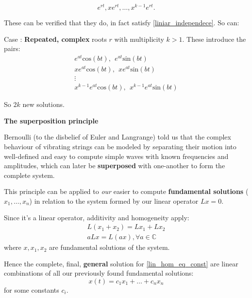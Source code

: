 \[
  e^{rt}, xe^{rt}, \dots,x^{k-1}e^{rt}.
\]

These can be verified that they do, in fact satisfy \ref{liniar_independece}. So can:

Case : \textbf{Repeated, complex} roots $r$ with multiplicity $k>1$. These introduce the pairs:
\begin{align*}
  e^{at}\text{cos}(bt), \ \  e^{at}\text{sin}(bt)  \\
  xe^{at}\text{cos}(bt), \ \ xe^{at}\text{sin}(bt) \\
  \vdots                                           \\
  x^{k-1}e^{at}\text{cos}(bt), \ \ x^{k-1}e^{at}\text{sin}(bt)
\end{align*}

So $2k$ new solutions.

\textbf{The superposition principle}

Bernoulli (to the disbelief of Euler and Langrange) told us that the complex behaviour of vibrating strings can be modeled by separating their motion into well-defined and easy to compute simple waves with known frequencies and amplitudes, which can later be \textbf{superposed} with one-another to form the complete system.

This principle can be applied to \textit{our} easier to compute \textbf{fundamental solutions} ($x_1,\dots,x_n$) in relation to the system formed by our linear operator $Lx =0$.

Since it's a linear operator, additivity and homogeneity apply:
\begin{gather*}
  L(x_1+x_2) = Lx_1 + Lx_2\\
  aLx = L(ax) , \forall a \in \mathbb{C}
\end{gather*}
where $x,x_1,x_2$ are fundamental solutions of the system.

Hence the complete, final, \textbf{general} solution for \ref{lin_hom_eq_const} are linear combinations of all our previously found fundamental solutions:
\[
  x(t) = c_1 x_1 + \dots + c_nx_n
\]
for some constants $c_i$.
